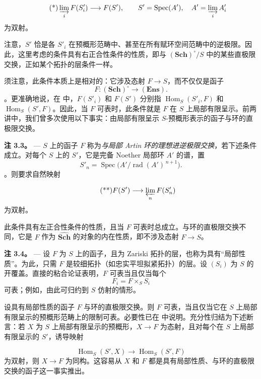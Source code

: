 \[
  \tag{*}
  \varinjlim_i F(S'_i)\longrightarrow F(S'),
  \qquad
  S'=\operatorname{Spec}(A'),
  \quad
  A'=\varinjlim_i A'_i
\] 为双射。

注意，\(S'\) 恰是各 \(S'_i\) 在预概形范畴中、甚至在所有赋环空间范畴中的逆极限。因此，这里考虑的条件具有右正合性条件的性质，即与 \((\mathbf{Sch})^\circ/S\) 中的某些直极限交换，正如某个拓扑的层条件一样。

须注意，此条件本质上是相对的：它涉及态射 \(F\to S\)，而不仅仅是函子 \[
  F:(\mathbf{Sch})^\circ\longrightarrow(\mathbf{Ens}).
\]。更准确地说，在  中，\(F(S'_i)\) 和 \(F(S')\) 分别指 \(\operatorname{Hom}_S(S'_i,F)\) 和 \(\operatorname{Hom}_S(S',F)\)。因此，当 \(F\) 可表时，此条件就是 \(F\) 在 \(S\) 上局部有限呈示。前两讲中，我们曾多次使用以下事实：由局部有限呈示 \(S\)-预概形表示的函子与环的直极限交换。

\medskip\noindent{}\textbf{注 3.3。} --- \(S\) 上的函子 \(F\) 称为\emph{与局部 Artin 环的理想进逆极限交换}，若下述条件成立。对每个 \(S\) 上的 \(S'\)，它是完备 Noether 局部环 \(A'\) 的谱，置 \[
  S'_n=\operatorname{Spec}
  \bigl(A'/\operatorname{rad}(A')^{\,n+1}\bigr).
\]。则要求自然映射

 \[
  \tag{**}
  F(S')\longrightarrow\varprojlim_n F(S'_n)
\] 为双射。

此条件具有左正合性条件的性质，且当 \(F\) 可表时总成立。与环的直极限交换不同，它是 \(F\) 作为 \(\widehat{\mathbf{Sch}}\) 的对象的内在性质，即不涉及态射 \(F\to S\)。

\medskip\noindent{}\textbf{注 3.4。} --- 设 \(F\) 为 \(S\) 上的函子，且为 Zariski 拓扑的层，也称为具有“局部性质”。为此，只需 \(F\) 是较细拓扑（如忠实平坦拟紧拓扑）的层。设 \((S_i)\) 为 \(S\) 的开覆盖。直接的粘合论证表明，\(F\) 可表当且仅当每个 \[
  F_i=F\times_S S_i
\] 可表；例如，由此可归约到 \(S\) 仿射的情形。

设具有局部性质的函子 \(F\) 与环的直极限交换。则 \(F\) 可表，当且仅当它在 \(S\) 上局部有限呈示的预概形范畴上的限制可表。必要性已在  中说明。充分性归结为下述断言：若 \(X\) 为 \(S\) 上局部有限呈示的预概形，\(X\to F\) 为态射，且对每个在 \(S\) 上局部有限呈示的 \(S'\)，诱导映射

 \[
  \operatorname{Hom}_S(S',X)\longrightarrow
  \operatorname{Hom}_S(S',F)
\] 为双射，则 \(X\to F\) 为同构。这容易从 \(X\) 和 \(F\) 都是具有局部性质、与环的直极限交换的函子这一事实推出。

